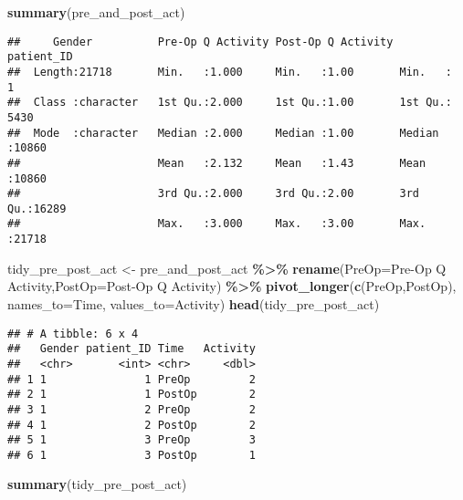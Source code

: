 \documentclass[
]{article}
\newenvironment{Shaded}{\begin{snugshade}}{\end{snugshade}}
\newcommand{\AttributeTok}[1]{\textcolor[rgb]{0.13,0.29,0.53}{#1}}
\newcommand{\FunctionTok}[1]{\textcolor[rgb]{0.13,0.29,0.53}{\textbf{#1}}}
\newcommand{\NormalTok}[1]{#1}
\newcommand{\OtherTok}[1]{\textcolor[rgb]{0.56,0.35,0.01}{#1}}
\newcommand{\SpecialCharTok}[1]{\textcolor[rgb]{0.81,0.36,0.00}{\textbf{#1}}}
\newcommand{\StringTok}[1]{\textcolor[rgb]{0.31,0.60,0.02}{#1}}
\begin{document}
\begin{Shaded}
\begin{Highlighting}[]
\FunctionTok{summary}\NormalTok{(pre\_and\_post\_act)}
\end{Highlighting}
\end{Shaded}

\begin{verbatim}
##     Gender          Pre-Op Q Activity Post-Op Q Activity   patient_ID   
##  Length:21718       Min.   :1.000     Min.   :1.00       Min.   :    1  
##  Class :character   1st Qu.:2.000     1st Qu.:1.00       1st Qu.: 5430  
##  Mode  :character   Median :2.000     Median :1.00       Median :10860  
##                     Mean   :2.132     Mean   :1.43       Mean   :10860  
##                     3rd Qu.:2.000     3rd Qu.:2.00       3rd Qu.:16289  
##                     Max.   :3.000     Max.   :3.00       Max.   :21718
\end{verbatim}

\begin{Shaded}
\begin{Highlighting}[]
\NormalTok{tidy\_pre\_post\_act }\OtherTok{\textless{}{-}}\NormalTok{ pre\_and\_post\_act }\SpecialCharTok{\%\textgreater{}\%} 
  \FunctionTok{rename}\NormalTok{(}\AttributeTok{PreOp=}\StringTok{\textquotesingle{}Pre{-}Op Q Activity\textquotesingle{}}\NormalTok{,}\AttributeTok{PostOp=}\StringTok{\textquotesingle{}Post{-}Op Q Activity\textquotesingle{}}\NormalTok{) }\SpecialCharTok{\%\textgreater{}\%} 
  \FunctionTok{pivot\_longer}\NormalTok{(}\FunctionTok{c}\NormalTok{(PreOp,PostOp),}
               \AttributeTok{names\_to=}\StringTok{\textquotesingle{}Time\textquotesingle{}}\NormalTok{,}
               \AttributeTok{values\_to=}\StringTok{\textquotesingle{}Activity\textquotesingle{}}\NormalTok{)}
\FunctionTok{head}\NormalTok{(tidy\_pre\_post\_act)}
\end{Highlighting}
\end{Shaded}

\begin{verbatim}
## # A tibble: 6 x 4
##   Gender patient_ID Time   Activity
##   <chr>       <int> <chr>     <dbl>
## 1 1               1 PreOp         2
## 2 1               1 PostOp        2
## 3 1               2 PreOp         2
## 4 1               2 PostOp        2
## 5 1               3 PreOp         3
## 6 1               3 PostOp        1
\end{verbatim}

\begin{Shaded}
\begin{Highlighting}[]
\FunctionTok{summary}\NormalTok{(tidy\_pre\_post\_act)}
\end{Highlighting}
\end{Shaded}
\end{document}
